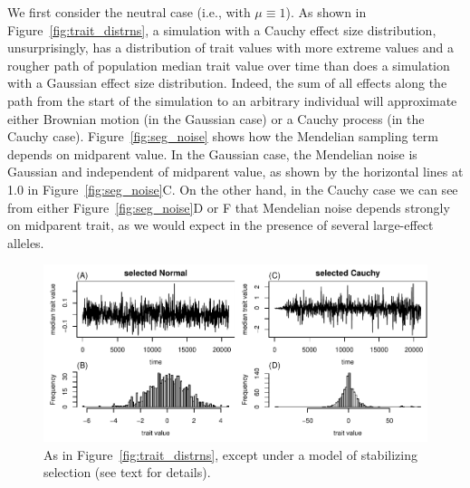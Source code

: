 \documentclass{article}
\newcommand{\1}{\mathbbm{1}}
\theoremstyle{remark}
\theoremstyle{definition}
\begin{document}
We first consider the neutral case (i.e., with $\mu \equiv 1$).
As shown in Figure~\ref{fig:trait_distrns},
a simulation with a Cauchy effect size distribution, unsurprisingly,
has a distribution of trait values with more extreme values
and a rougher path of population median trait value over time
than does a simulation with a Gaussian effect size distribution.
Indeed, the sum of all effects along the path from the start of the simulation
to an arbitrary individual will approximate either Brownian motion (in the Gaussian case)
or a Cauchy process (in the Cauchy case).
Figure~\ref{fig:seg_noise} shows how the Mendelian sampling term
depends on midparent value.
In the Gaussian case, the Mendelian noise is Gaussian and independent of midparent value,
as shown by the horizontal lines at 1.0 in Figure~\ref{fig:seg_noise}C. 
On the other hand, in the Cauchy case we can see from either Figure~\ref{fig:seg_noise}D or F
that Mendelian noise depends strongly on midparent trait,
as we would expect in the presence of several large-effect alleles.

\begin{figure}
    \begin{center}
        \includegraphics{sims/selected_trait_traces}
    \end{center}
    \caption{
        As in Figure~\ref{fig:trait_distrns},
        except under a model of stabilizing selection (see text for details).
        \label{fig:sel_trait_distrns}
    }
\end{figure}
\end{document}
